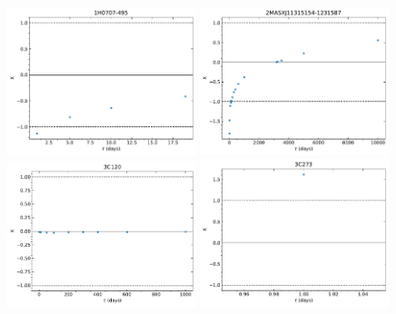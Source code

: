 \begin{figure}
\begin{center}
    {
  \includegraphics[width=0.49\textwidth]{Figs/Chapter5/X_tau/X_tau_1H0707-495.pdf}  \hfill
  \includegraphics[width=0.49\textwidth]{Figs/Chapter5/X_tau/X_tau_2MASXJ11315154-1231587.pdf} \\
  \includegraphics[width=0.49\textwidth]{Figs/Chapter5/X_tau/X_tau_3C120.pdf} \hfill 
  \includegraphics[width=0.49\textwidth]{Figs/Chapter5/X_tau/X_tau_3C273.pdf} \hfill \\
}
\end{center}
\end{figure}
